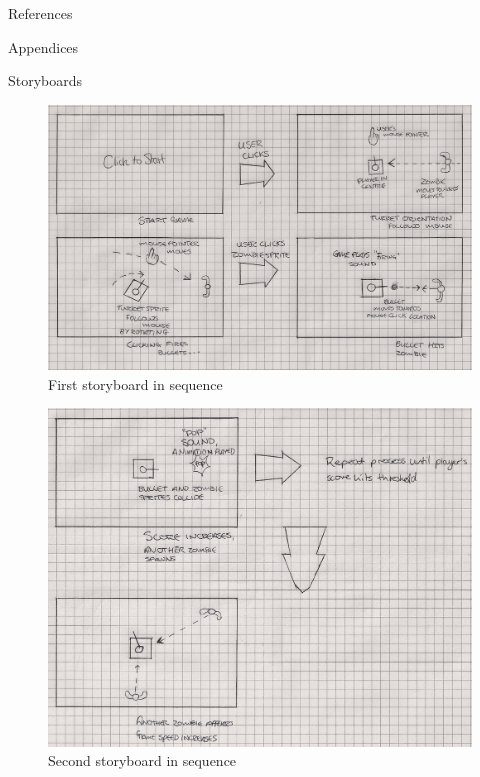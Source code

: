 \documentclass[11pt]{article}
\begin{document}
\nocite{LaTeXTemplate}

\newpage
\begin{section}{References}
	
	
\end{section}

\clearpage
\begin{landscape}
    \begin{section}{Appendices}
    \label{appendices}
        \begin{subsection}{Storyboards}
        \vspace{0.5in}
            \begin{figure}[htp]
      		\centering
                    \includegraphics[height=0.5\columnwidth]{img/storyboard_1}
	    		\caption{First storyboard in sequence}
    		\end{figure}
    		
    		\clearpage
    		\begin{figure}[htp]
	    		\centering
                    \includegraphics[height=0.7\columnwidth]{img/storyboard_2}
	    		\caption{Second storyboard in sequence}
    		\end{figure}
    		

\end{subsection}
\end{section}
\end{landscape}
\end{document}
